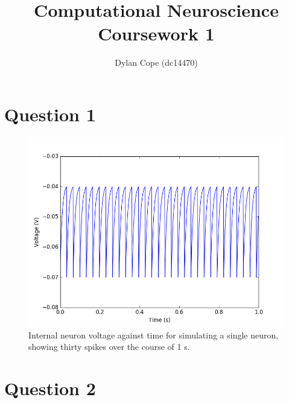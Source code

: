 \documentclass[12pt, a4paper]{article}
\title{Computational Neuroscience Coursework 1}
\author{Dylan Cope (dc14470)}
\date{}
\begin{document}
\nocite{*}


\maketitle

\section*{Question 1}


\begin{figure}[H]
  \centering
  \includegraphics[width=1\linewidth]{figures/q1}
  \caption{Internal neuron voltage against time for simulating a single neuron, showing thirty spikes over the course of 1 s.}
\end{figure}

\section*{Question 2}
\end{document}
